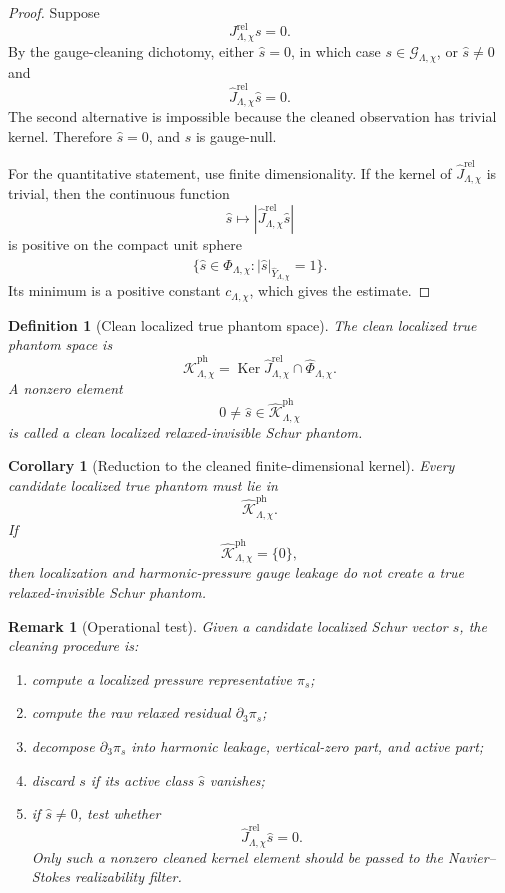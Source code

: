 \documentclass[11pt]{article}
\numberwithin{equation}{section}
\newtheorem{corollary}[theorem]{Corollary}
\newtheorem{definition}[theorem]{Definition}
\newtheorem{remark}[theorem]{Remark}
\DeclareMathOperator{\Ker}{Ker}
\begin{document}
\begin{proof}
Suppose
\[
        J_{\Lambda,\chi}^{\mathrm{rel}}s=0.
\]
By the gauge-cleaning dichotomy, either \(\widehat s=0\), in which case \(s\in\mathcal G_{\Lambda,\chi}\), or \(\widehat s\neq0\) and
\[
        \widehat J_{\Lambda,\chi}^{\mathrm{rel}}\widehat s=0.
\]
The second alternative is impossible because the cleaned observation has trivial kernel.  Therefore \(\widehat s=0\), and \(s\) is gauge-null.

For the quantitative statement, use finite dimensionality.  If the kernel of \(\widehat J_{\Lambda,\chi}^{\mathrm{rel}}\) is trivial, then the continuous function
\[
        \widehat s\mapsto
        |\widehat J_{\Lambda,\chi}^{\mathrm{rel}}\widehat s|
\]
is positive on the compact unit sphere
\[
        \{\widehat s\in\widehat\Phi_{\Lambda,\chi}:
        |\widehat s|_{\widehat Y_{\Lambda,\chi}}=1\}.
\]
Its minimum is a positive constant \(c_{\Lambda,\chi}\), which gives the estimate.
\end{proof}

\begin{definition}[Clean localized true phantom space]\label{def:clean-localized-true-phantom}
The clean localized true phantom space is
\[
        \widehat{\mathcal K}_{\Lambda,\chi}^{\mathrm{ph}}
        =
        \Ker \widehat J_{\Lambda,\chi}^{\mathrm{rel}}
        \cap
        \widehat\Phi_{\Lambda,\chi}.
\]
A nonzero element
\[
        0\neq \widehat s\in
        \widehat{\mathcal K}_{\Lambda,\chi}^{\mathrm{ph}}
\]
is called a clean localized relaxed-invisible Schur phantom.
\end{definition}

\begin{corollary}[Reduction to the cleaned finite-dimensional kernel]\label{cor:reduction-cleaned-finite-kernel}
Every candidate localized true phantom must lie in
\[
        \widehat{\mathcal K}_{\Lambda,\chi}^{\mathrm{ph}}.
\]
If
\[
        \widehat{\mathcal K}_{\Lambda,\chi}^{\mathrm{ph}}=\{0\},
\]
then localization and harmonic-pressure gauge leakage do not create a true relaxed-invisible Schur phantom.
\end{corollary}

\begin{remark}[Operational test]\label{rem:operational-test-cleaning}
Given a candidate localized Schur vector \(s\), the cleaning procedure is:
\begin{enumerate}[label=(\roman*)]
\item compute a localized pressure representative \(\pi_s\);
\item compute the raw relaxed residual \(\partial_3\pi_s\);
\item decompose \(\partial_3\pi_s\) into harmonic leakage, vertical-zero part, and active part;
\item discard \(s\) if its active class \(\widehat s\) vanishes;
\item if \(\widehat s\neq0\), test whether
\[
        \widehat J_{\Lambda,\chi}^{\mathrm{rel}}\widehat s=0.
\]
Only such a nonzero cleaned kernel element should be passed to the Navier--Stokes realizability filter.
\end{enumerate}
\end{remark}
\end{document}
